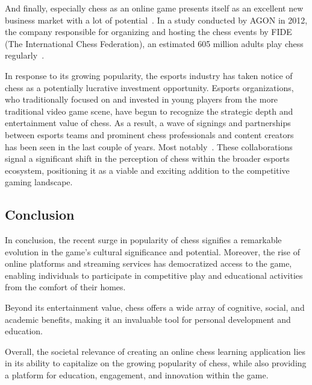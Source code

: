 And finally, especially chess as an online game presents itself as an excellent new business market with a lot of
potential~\cite{business-insider2021}.
In a study conducted by AGON in 2012, the company responsible for organizing and hosting the chess events by FIDE (The
International Chess Federation), an estimated 605 million adults play chess regularly~\cite{chessbase2012}.

In response to its growing popularity, the esports industry has taken notice of chess as a potentially lucrative
investment opportunity.
Esports organizations, who traditionally focused on and invested in young players from the more traditional video game
scene, have begun to recognize the strategic depth and entertainment value of chess.
As a result, a wave of signings and partnerships between esports teams and prominent chess professionals and content
creators has been seen in the last couple of years.
Most notably~.
These collaborations signal a significant shift in the perception of chess within the broader esports ecosystem,
positioning it as a viable and exciting addition to the competitive gaming landscape.


\subsection{Conclusion}\label{subsec:conclusion}

In conclusion, the recent surge in popularity of chess signifies a remarkable evolution in the game's cultural
significance and potential.
Moreover, the rise of online platforms and streaming services has democratized access to the game, enabling individuals
to participate in competitive play and educational activities from the comfort of their homes.

Beyond its entertainment value, chess offers a wide array of cognitive, social, and academic benefits, making it an
invaluable tool for personal development and education.

Overall, the societal relevance of creating an online chess learning application lies in its ability to capitalize on
the growing popularity of chess, while also providing a platform for education, engagement, and innovation within the
game.
